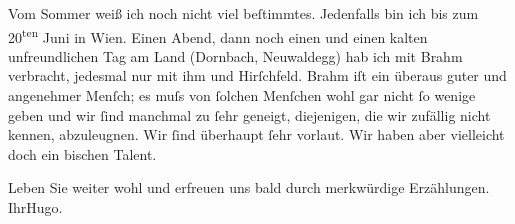 \pstart
           Vom Sommer weiß ich noch nicht viel beſtimmtes. Jedenfalls bin ich bis zum
                     20\textsuperscript{ten} Juni in Wien. Einen Abend, dann noch einen und einen kalten
               unfreundlichen Tag am Land (Dornbach, Neuwaldegg) hab ich mit Brahm verbracht, jedesmal {\pb}nur mit ihm und Hirſchfeld. Brahm iſt ein überaus guter und angenehmer Menſch; es muſs von ſolchen
               Menſchen wohl gar nicht ſo wenige geben und wir ſind manchmal zu ſehr geneigt,
               diejenigen, die wir zufällig nicht kennen, abzuleugnen. Wir ſind überhaupt ſehr
               vorlaut. Wir haben aber vielleicht doch ein bischen Talent.\pend
           
\pstart
           Leben Sie weiter wohl und erfreuen uns bald durch merkwürdige Erzählungen.\pend
           \pstart Ihr\spacefill\mbox{Hugo.}\pend{}\endnumbering{}  
      